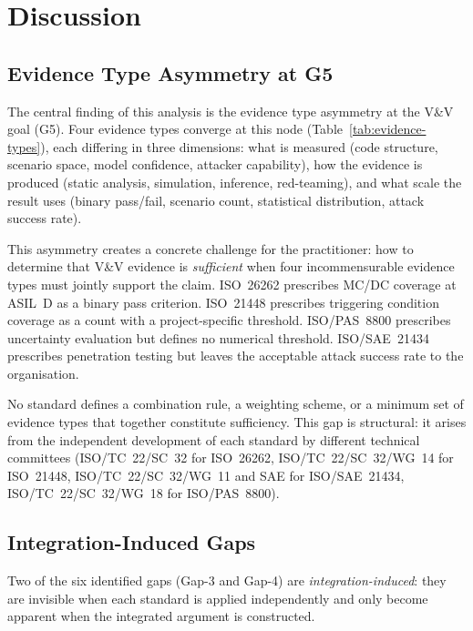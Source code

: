 
\section{Discussion}\label{sec:discussion}

\subsection{Evidence Type Asymmetry at G5}

The central finding of this analysis is the evidence type asymmetry at
the V\&V goal (G5). Four evidence types converge at this node
(Table~\ref{tab:evidence-types}), each differing in three dimensions:
what is measured (code structure, scenario space, model confidence,
attacker capability), how the evidence is produced (static analysis,
simulation, inference, red-teaming), and what scale the result uses
(binary pass/fail, scenario count, statistical distribution, attack
success rate).

This asymmetry creates a concrete challenge for the practitioner: how
to determine that V\&V evidence is \emph{sufficient} when four
incommensurable evidence types must jointly support the claim. ISO~26262
prescribes MC/DC coverage at ASIL~D as a binary pass criterion.
ISO~21448 prescribes triggering condition coverage as a count with a
project-specific threshold. ISO/PAS~8800 prescribes uncertainty
evaluation but defines no numerical threshold. ISO/SAE~21434 prescribes
penetration testing but leaves the acceptable attack success rate to the
organisation.

No standard defines a combination rule, a weighting scheme, or a
minimum set of evidence types that together constitute sufficiency.
This gap is structural: it arises from the independent development of
each standard by different technical committees (ISO/TC~22/SC~32 for
ISO~26262, ISO/TC~22/SC~32/WG~14 for ISO~21448, ISO/TC~22/SC~32/WG~11
and SAE for ISO/SAE~21434, ISO/TC~22/SC~32/WG~18 for ISO/PAS~8800).

\subsection{Integration-Induced Gaps}

Two of the six identified gaps (Gap-3 and Gap-4) are
\emph{integration-induced}: they are invisible when each standard is
applied independently and only become apparent when the integrated
argument is constructed.

